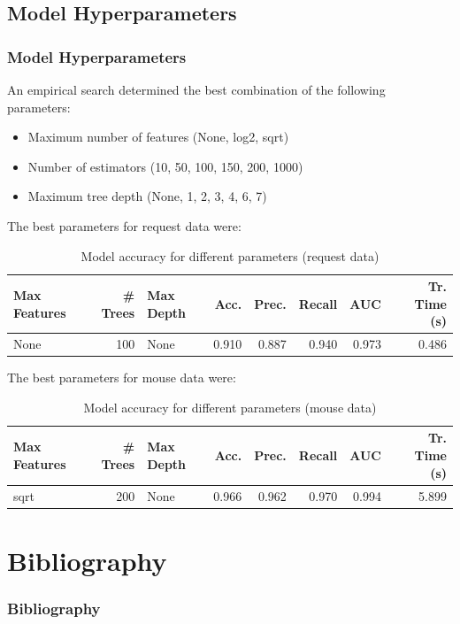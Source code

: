 \documentclass[t,aspectratio=169,table]{beamer}
\begin{document}
\subsection{Model Hyperparameters}
\begin{frame}
\frametitle{Model Hyperparameters}

An empirical search determined the best combination of the following parameters:

\begin{itemize}
    \item Maximum number of features (None, log2, sqrt)
    \item Number of estimators (10, 50, 100, 150, 200, 1000)
    \item Maximum tree depth (None, 1, 2, 3, 4, 6, 7)
\end{itemize}
The best parameters for request data were:
\begin{table}
    \begin{center}
        \begin{tabular}{lrlrrrrr}
            Max Features & \# Trees & Max Depth & Acc. & Prec. & Recall & AUC & Tr. Time (s) \\
            \midrule
            \rowcolor{green!30}
            None & 100 & None & 0.910 & 0.887 & 0.940 & 0.973 & 0.486 \\
        \end{tabular}
    \end{center}
    \caption{Model accuracy for different parameters (request data)}
    \label{table:request_params}
\end{table}
The best parameters for mouse data were:
\begin{table}
    \begin{center}
        \begin{tabular}{lrlrrrrr}
            Max Features & \# Trees & Max Depth & Acc. & Prec. & Recall & AUC & Tr. Time (s) \\
            \midrule
            \rowcolor{green!30}
            sqrt & 200 & None & 0.966 & 0.962 & 0.970 & 0.994 & 5.899 \\
        \end{tabular}
    \end{center}
    \caption{Model accuracy for different parameters (mouse data)}
    \label{table:mouse_params}
\end{table}


\end{frame}

\section{Bibliography}
\begin{frame}
\frametitle{Bibliography}

\begin{raggedright}
  \printbibliography
\end{raggedright}

\end{frame}
\end{document}
